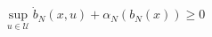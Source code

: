 \documentclass[preview]{standalone}
\begin{document}
\begin{align*}
&\ \sup_{u \in \mathcal{U}} \dot b_N(x, u) + \alpha_N(b_N(x)) \geq 0
\end{align*}
\end{document}

